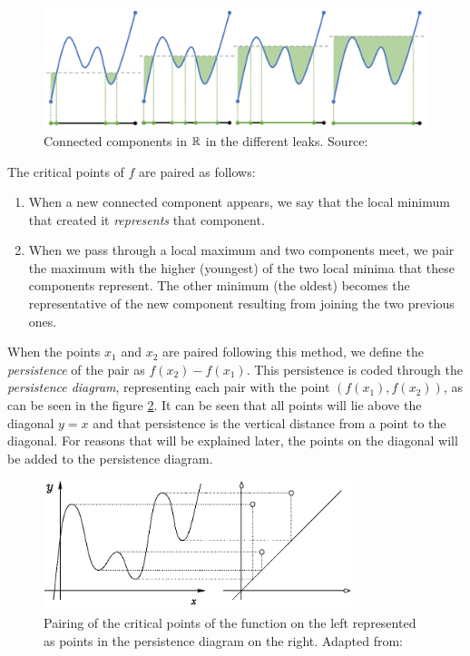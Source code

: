 \documentclass[../main.tex]{subfiles}
\begin{document}
\begin{figure}[!ht]
    \centering
    \includegraphics[width=\textwidth]{figures/bg/Sub-level-Filtrations.png}
    \caption{Connected components in $\mathbb{R}$ in the different leaks. Source: \cite{curry_counting_2020}}
    \label{fig:sublevelR}
\end{figure}

The critical points of $f$ are paired as follows:
\begin{enumerate}
    \item When a new connected component appears, we say that the local minimum that created it \emph{represents} that component.
    \item When we pass through a local maximum and two components meet, we pair the maximum with the higher (youngest) of the two local minima that these components represent. The other minimum (the oldest) becomes the representative of the new component resulting from joining the two previous ones.
\end{enumerate}

When the points $x_1$ and $x_2$ are paired following this method, we define the \emph{persistence} of the pair as $f(x_2) - f(x_1)$. This persistence is coded through the \emph{persistence diagram}, representing each pair with the point $(f(x_1),f(x_2))$, as can be seen in the figure \ref{fig:persistenceR}. It can be seen that all points will lie above the diagonal $y=x$ and that persistence is the vertical distance from a point to the diagonal. For reasons that will be explained later, the points on the diagonal will be added to the persistence diagram.

\begin{figure}[!ht]
\centering
\includegraphics[width=0.8\textwidth]{figures/bg/diagramaR.png} 
\caption{Pairing of the critical points of the function on the left represented as points in the persistence diagram on the right. Adapted from: \cite{goodman_persistent_2008}}
\label{fig:persistenceR}
\end{figure}
\end{document}
